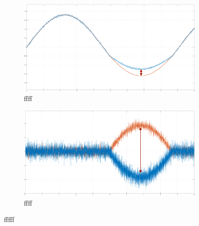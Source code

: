 \begin{figure}
	\begin{subfigure}[h!]{1\linewidth}
		\centering
		\includegraphics[width=\textwidth, height=\textwidth/2]{Images/rigidContactReacPosArrow}
		\caption{ ffff}
		\label{fig:ContactRigPos}
	\end{subfigure}	
  \newline
	\begin{subfigure}[h!]{1\linewidth}
		\centering
		\includegraphics[width=\textwidth, height=\textwidth/2]{Images/rigidContactReacTorArrow}
		\caption{ ffff}
		\label{fig:ContactRigTor}
	\end{subfigure}	
 \caption{ fffff }
\end{figure}






